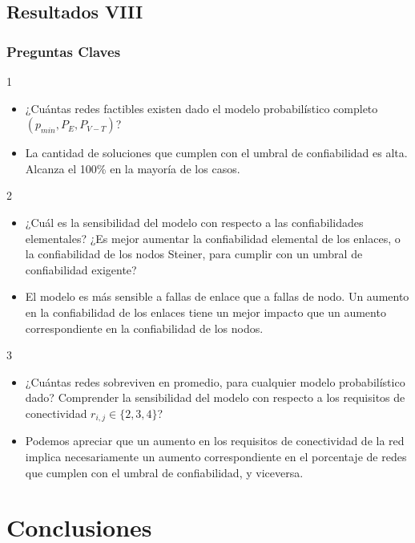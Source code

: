\subsection{Resultados VIII}
\begin{frame} \frametitle{Preguntas Claves}
\begin{tiny}
\begin{block} {1}
 	 \begin{itemize}
 	 	\item ¿Cuántas redes factibles existen dado el modelo probabilístico completo $(p_{min},P_E,P_{V-T})$?
 	 	\item La cantidad de soluciones que cumplen con el umbral de confiabilidad es alta. Alcanza el 100\% en la mayoría de los casos.
 	 \end{itemize}  
 \end{block} 	   
 \begin{block} {2}
 	 \begin{itemize}
 	 	\item ¿Cuál es la sensibilidad del modelo con respecto a las confiabilidades elementales? ¿Es mejor aumentar la confiabilidad elemental de los enlaces, o la confiabilidad de los nodos Steiner, para cumplir con un umbral de confiabilidad exigente?
 	 	\item El modelo es más sensible a fallas de enlace que a fallas de nodo. Un aumento en la confiabilidad de los enlaces tiene un mejor impacto que un aumento correspondiente en la confiabilidad de los nodos.
 	 \end{itemize}  
 \end{block} 	
  \begin{block} {3}
 	 \begin{itemize}
 	 	\item ¿Cuántas redes sobreviven en promedio, para cualquier modelo probabilístico dado? Comprender la sensibilidad del modelo con respecto a los requisitos de conectividad $r_{i,j} \in \{2,3,4\}$?
 	 	\item Podemos apreciar que un aumento en los requisitos de conectividad de la red implica necesariamente un aumento correspondiente en el porcentaje de redes que cumplen con el umbral de confiabilidad, y viceversa.
 	 \end{itemize}  
 \end{block} 	
 \end{tiny}
\end{frame}

\section{Conclusiones}
